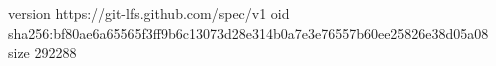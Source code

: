 version https://git-lfs.github.com/spec/v1
oid sha256:bf80ae6a65565f3ff9b6c13073d28e314b0a7e3e76557b60ee25826e38d05a08
size 292288
